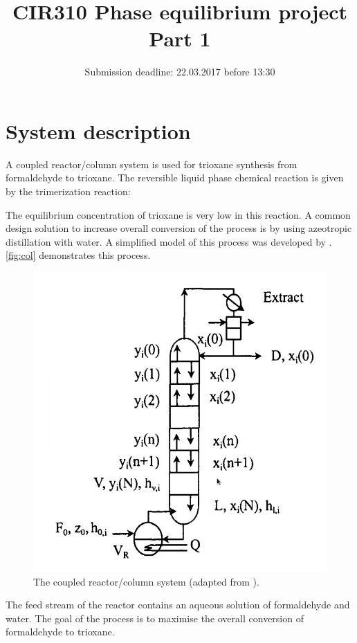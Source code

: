 \documentclass[12pt, A4paper]{article}
\title{CIR310 Phase equilibrium project\\Part 1}
\date{Submission deadline: 22.03.2017 before 13:30}
\begin{document}
\maketitle
\section{System description}
A coupled reactor/column system is used for trioxane synthesis from formaldehyde to trioxane.  The reversible liquid phase chemical reaction is given by the trimerization reaction:
 
{\centering
{} \par
}
The equilibrium concentration of trioxane is very low in this reaction. A common design solution to increase overall conversion of the process is by using azeotropic distillation with water. A simplified model of this process was developed by \citet{HU19991353}. \autoref{fig:col} demonstrates this process.

 \begin{figure} \centering
 \includegraphics[scale=0.45]{img/reaccol.png}
 \caption{ The coupled reactor/column system (adapted from \citet{HU19991353}).} \label{fig:col}
\end{figure}
 
The feed stream of the reactor contains an aqueous solution of formaldehyde and water.
The goal of the process is to maximise the overall conversion of formaldehyde to trioxane.
\end{document}
